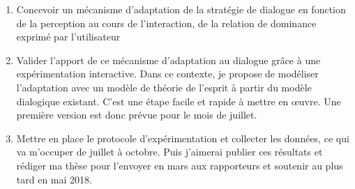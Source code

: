 \documentclass  [french] {article}
\begin{document}
	\begin{enumerate}
		\item Concevoir un mécanisme d'adaptation de la stratégie de dialogue en fonction de la perception au cours de l'interaction, de la relation de dominance exprimé par l'utilisateur
		\item Valider l'apport de ce mécanisme d'adaptation au dialogue grâce à une expérimentation interactive. Dans ce contexte, je propose de modéliser l'adaptation avec un modèle de théorie de l'esprit \cite{carlson2013theory} à partir du modèle dialogique existant. C'est une étape facile et rapide à mettre en œuvre. Une première version est donc prévue pour le mois de juillet.  
		\item Mettre en place le protocole d'expérimentation et collecter les données, ce qui va m'occuper de juillet à octobre. Puis j'aimerai publier ces résultats et rédiger ma thèse pour l'envoyer en mars aux rapporteurs et soutenir au plus tard en mai 2018.
	\end{enumerate}


	
	  
	
		
		
		\scriptsize{	
			
			}

	
\end{document}
